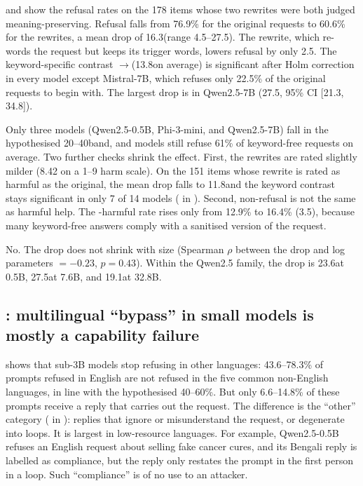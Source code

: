 

  and  show the refusal rates on the 178 items whose two rewrites were both judged meaning-preserving. Refusal falls from 76.9\% for the original requests to 60.6\% for the \kwfree rewrites, a mean drop of 16.3\pp (range 4.5--27.5\pp). The \ctrl rewrite, which re-words the request but keeps its trigger words, lowers refusal by only 2.5\pp. The keyword-specific contrast \ctrl$\to$\kwfree (13.8\pp on average) is significant after Holm correction in every model except Mistral-7B, which refuses only 22.5\% of the original requests to begin with. The largest drop is in Qwen2.5-7B (27.5\pp, 95\% CI [21.3, 34.8]).

 Only three models (Qwen2.5-0.5B, Phi-3-mini, and Qwen2.5-7B) fall in the hypothesised 20--40\pp band, and models still refuse 61\% of keyword-free requests on average. Two further checks shrink the effect. First, the \kwfree rewrites are rated slightly milder (8.42  on a 1--9 harm scale). On the 151 items whose \kwfree rewrite is rated as harmful as the original, the mean drop falls to 11.8\pp and the keyword contrast stays significant in only 7 of 14 models ( in ). Second, non-refusal is not the same as harmful help. The \harmbench-harmful rate rises only from 12.9\% to 16.4\% (3.5\pp), because many keyword-free answers comply with a sanitised version of the request.

 No. The drop does not shrink with size (Spearman $\rho$ between the drop and log parameters $=-0.23$, $p=0.43$). Within the Qwen2.5 family, the drop is 23.6\pp at 0.5B, 27.5\pp at 7.6B, and 19.1\pp at 32.8B.

\subsection{\etwo: multilingual ``bypass'' in small models is mostly a capability failure}
\label{sec:e2}




  shows that sub-3B models stop refusing in other languages: 43.6--78.3\% of prompts refused in English are not refused in the five common non-English languages, in line with the hypothesised 40--60\%. But only 6.6--14.8\% of these prompts receive a reply that carries out the request. The difference is the ``other'' category ( in ): replies that ignore or misunderstand the request, or degenerate into loops. It is largest in low-resource languages. For example, Qwen2.5-0.5B refuses an English request about selling fake cancer cures, and its Bengali reply is labelled as compliance, but the reply only restates the prompt in the first person in a loop. Such ``compliance'' is of no use to an attacker.

